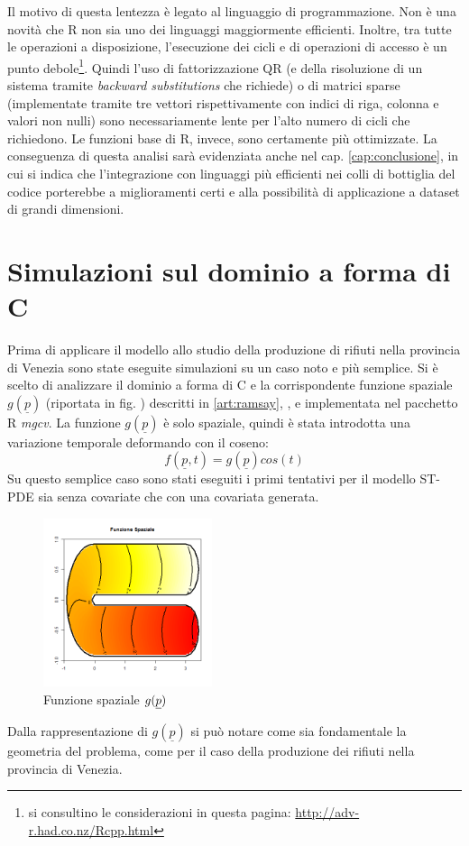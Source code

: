 \documentclass[a4paper,11pt,twoside,openright]{book}							%
\begin{document}
Il motivo di questa lentezza è legato al linguaggio di programmazione. Non è una novità che R non sia uno dei linguaggi maggiormente efficienti. Inoltre, tra tutte le operazioni a disposizione, l'esecuzione dei cicli e di operazioni di accesso è un punto debole\footnote{si consultino le considerazioni in questa pagina: \href{http://adv-r.had.co.nz/Rcpp.html}{http://adv-r.had.co.nz/Rcpp.html}}. Quindi l'uso di fattorizzazione QR (e della risoluzione di un sistema tramite \textit{backward substitutions} che richiede) o di matrici sparse (implementate tramite tre vettori rispettivamente con indici di riga, colonna e valori non nulli) sono necessariamente lente per l'alto numero di cicli che richiedono. Le funzioni base di R, invece, sono certamente più ottimizzate. La conseguenza di questa analisi sarà evidenziata anche nel cap. \ref{cap:conclusione}, in cui si indica che l'integrazione con linguaggi più efficienti nei colli di bottiglia del codice porterebbe a miglioramenti certi e alla possibilità di applicazione a dataset di grandi dimensioni.

\chapter{Simulazioni sul dominio a forma di C}
\label{cap:domC}
Prima di applicare il modello allo studio della produzione di rifiuti nella provincia di Venezia sono state eseguite simulazioni su un caso noto e più semplice. Si è scelto di analizzare il dominio a forma di C e la corrispondente funzione spaziale $g(\underline p)$ (riportata in fig. \cite{fig:domC_fstest}) descritti in \ref{art:ramsay}, \cite{art:sangalli}, \cite{art:wood} e implementata nel pacchetto R \textit{mgcv}. La funzione $g(\underline p)$ è solo spaziale, quindi è stata introdotta una variazione temporale deformando con il coseno:
$$
f(\underline p, t)=g(\underline p)cos(t)
$$
Su questo semplice caso sono stati eseguiti i primi tentativi per il modello ST-PDE sia senza covariate che con una covariata generata.
\begin{figure}[h]
	\centering
	\includegraphics[width=0.44\textwidth]{Immagini/DomCinizio/DomC_fstest.png}   
	\caption{Funzione spaziale $g(\protect\underline{p})$}
	\label{fig:domC_fstest}
\end{figure}
\newpage
\noindent Dalla rappresentazione di $g(\underline p)$ si può notare come sia fondamentale la geometria del problema, come per il caso della produzione dei rifiuti nella provincia di Venezia.
\end{document}

